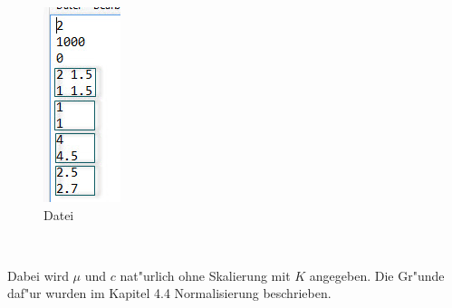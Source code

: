 \documentclass[11pt, a4paper, german]{article}
\theoremstyle{plain}
\begin{document}
	\begin{center}
	\begin{minipage}{0.15\textwidth}
		\begin{figure}[H]
			\centering
			\includegraphics[width=1\linewidth]{./Pictures/Parameter}
			\caption[Parameter]{Datei}
			\label{Parameter}
		\end{figure}
	\end{minipage}
	$ \quad $
	\begin{minipage}{0.6\textwidth}
		Dabei wird $ \mu $ und $ c $ nat"urlich ohne Skalierung mit $ K $ angegeben. Die Gr"unde daf"ur wurden im Kapitel 4.4 Normalisierung beschrieben.\\
		

\end{minipage}
\end{center}
\end{document}
